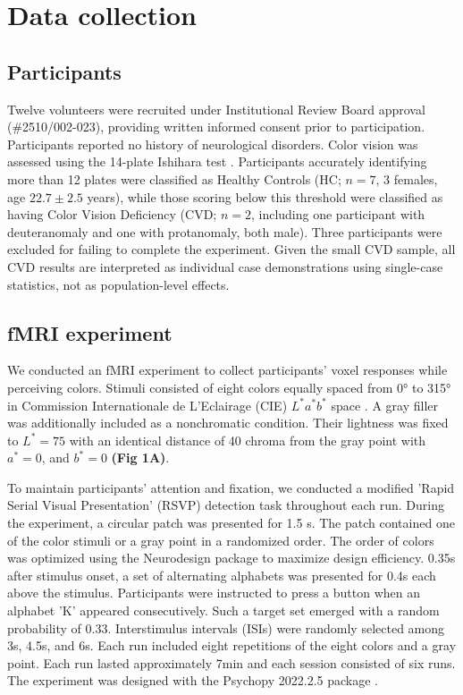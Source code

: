 
\section{Data collection}

\subsection*{Participants}

Twelve volunteers were recruited under Institutional Review Board approval (\#2510/002-023), providing written informed consent prior to participation. Participants reported no history of neurological disorders. Color vision was assessed using the 14-plate Ishihara test \cite{ishihara1917}. Participants accurately identifying more than 12 plates were classified as Healthy Controls (HC; $n=7$, 3 females, age $22.7 \pm 2.5$ years), while those scoring below this threshold were classified as having Color Vision Deficiency (CVD; $n=2$, including one participant with deuteranomaly and one with protanomaly, both male). Three participants were excluded for failing to complete the experiment. Given the small CVD sample, all CVD results are interpreted as individual case demonstrations using  single-case statistics, not as population-level effects.

\subsection*{fMRI experiment}

We conducted an fMRI experiment to collect participants' voxel responses while perceiving colors. Stimuli consisted of eight colors equally spaced from 0° to 315° in Commission Internationale de L'Eclairage (CIE) $L^*a^*b^*$ space \cite{cie1986}. A gray filler was additionally included as a nonchromatic condition. Their lightness was fixed to $L^* = 75$ with an identical distance of 40 chroma from the gray point with $a^* = 0$, and $b^* = 0$ \textbf{(Fig 1A)}.

To maintain participants' attention and fixation, we conducted a modified 'Rapid Serial Visual Presentation' (RSVP) detection task \cite{brouwer2009} throughout each run. During the experiment, a circular patch was presented for 1.5 s. The patch contained one of the color stimuli or a gray point in a randomized order. The order of colors was optimized using the Neurodesign package \cite{durnez2018} to maximize design efficiency. 0.35s after stimulus onset, a set of alternating alphabets was presented for 0.4s each above the stimulus. Participants were instructed to press a button when an alphabet 'K' appeared consecutively. Such a target set emerged with a random probability of 0.33. Interstimulus intervals (ISIs) were randomly selected among 3s, 4.5s, and 6s. Each run included eight repetitions of the eight colors and a gray point. Each run lasted approximately 7min and each session consisted of six runs. The experiment was designed with the Psychopy 2022.2.5 package \cite{peirce2019}.

